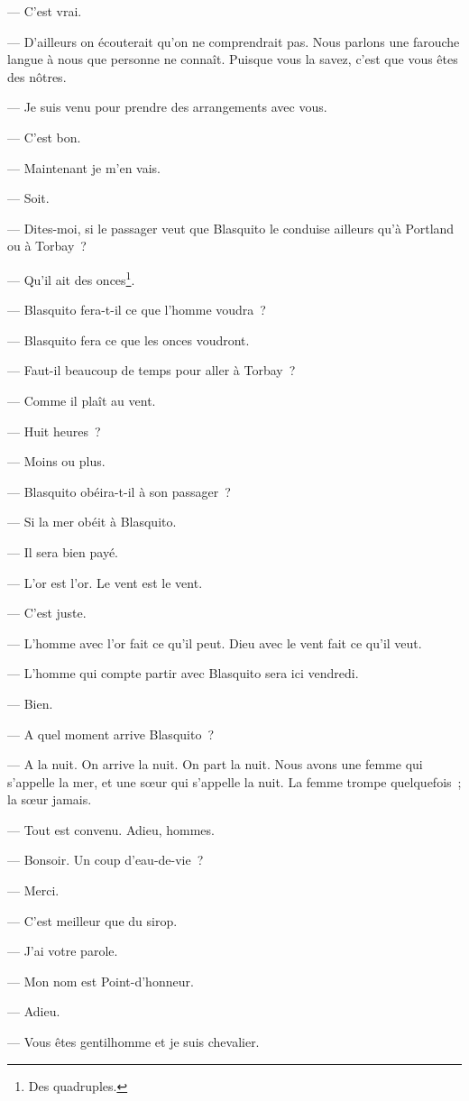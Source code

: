 \documentclass[french,twoside]{book} %
\begin{document}
{ — C’est vrai.\par
 — D’ailleurs on écouterait qu’on ne comprendrait pas. Nous parlons une farouche langue à nous que personne ne connaît. Puisque vous la savez, c’est que vous êtes des nôtres.\par
 — Je suis venu pour prendre des arrangements avec vous.\par
 — C’est bon.\par
 — Maintenant je m’en vais.\par
 — Soit.\par
 — Dites-moi, si le passager veut que Blasquito le conduise ailleurs qu’à Portland ou à Torbay ?\par
 — Qu’il ait des onces\footnote{ \noindent Des quadruples.
 }.\par
 — Blasquito fera-t-il ce que l’homme voudra ?\par
 — Blasquito fera ce que les onces voudront.\par
 — Faut-il beaucoup de temps pour aller à Torbay ?\par
 — Comme il plaît au vent.\par
 — Huit heures ?\par
 — Moins ou plus.\par
 — Blasquito obéira-t-il à son passager ?\par
 — Si la mer obéit à Blasquito.\par
 — Il sera bien payé.\par
 — L’or est l’or. Le vent est le vent.\par
 — C’est juste.\par
 — L’homme avec l’or fait ce qu’il peut. Dieu avec le vent fait ce qu’il veut.\par
 — L’homme qui compte partir avec Blasquito sera ici vendredi.\par
 — Bien.\par
 — A quel moment arrive Blasquito ?\par
 — A la nuit. On arrive la nuit. On part la nuit. Nous avons une femme qui s’appelle la mer, et une sœur qui s’appelle la nuit. La femme trompe quelquefois ; la sœur jamais.\par
 — Tout est convenu. Adieu, hommes.\par
 — Bonsoir. Un coup d’eau-de-vie ?\par
 — Merci.\par
 — C’est meilleur que du sirop.\par
 — J’ai votre parole.\par
 — Mon nom est Point-d’honneur.\par
 — Adieu.\par
 — Vous êtes gentilhomme et je suis chevalier.
 }\par
\end{document}
